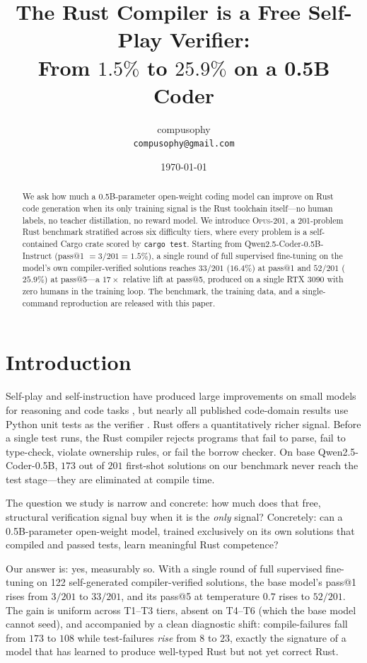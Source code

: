 \documentclass[11pt,a4paper]{article}
\title{The Rust Compiler is a Free Self-Play Verifier:\\
From $1.5\%$ to $25.9\%$ on a 0.5B Coder}
\author{%
  compusophy \\
  \texttt{compusophy@gmail.com}
}
\date{\today}
\begin{document}
\maketitle

\begin{abstract}
We ask how much a 0.5B-parameter open-weight coding model can improve on Rust code generation when its only training signal is the Rust toolchain itself---no human labels, no teacher distillation, no reward model. We introduce \textsc{Opus-201}, a 201-problem Rust benchmark stratified across six difficulty tiers, where every problem is a self-contained Cargo crate scored by \texttt{cargo test}. Starting from Qwen2.5-Coder-0.5B-Instruct (pass@1 $= 3/201 = 1.5\%$), a single round of full supervised fine-tuning on the model's own compiler-verified solutions reaches $33/201$ ($16.4\%$) at pass@1 and $52/201$ ($25.9\%$) at pass@5---a $17\times$ relative lift at pass@5, produced on a single RTX 3090 with zero humans in the training loop. The benchmark, the training data, and a single-command reproduction are released with this paper.
\end{abstract}

\section{Introduction}

Self-play and self-instruction have produced large improvements on small models for reasoning and code tasks \cite{zelikman2022star,wang2022selfinstruct}, but nearly all published code-domain results use Python unit tests as the verifier \cite{chen2021evaluating,austin2021program}. Rust offers a quantitatively richer signal. Before a single test runs, the Rust compiler rejects programs that fail to parse, fail to type-check, violate ownership rules, or fail the borrow checker. On base Qwen2.5-Coder-0.5B, $173$ out of $201$ first-shot solutions on our benchmark never reach the test stage---they are eliminated at compile time.

The question we study is narrow and concrete: how much does that free, structural verification signal buy when it is the \emph{only} signal? Concretely: can a 0.5B-parameter open-weight model, trained exclusively on its own solutions that compiled and passed tests, learn meaningful Rust competence?

Our answer is: yes, measurably so. With a single round of full supervised fine-tuning on 122 self-generated compiler-verified solutions, the base model's pass@1 rises from $3/201$ to $33/201$, and its pass@5 at temperature $0.7$ rises to $52/201$. The gain is uniform across T1--T3 tiers, absent on T4--T6 (which the base model cannot seed), and accompanied by a clean diagnostic shift: compile-failures fall from $173$ to $108$ while test-failures \emph{rise} from $8$ to $23$, exactly the signature of a model that has learned to produce well-typed Rust but not yet correct Rust.
\end{document}
